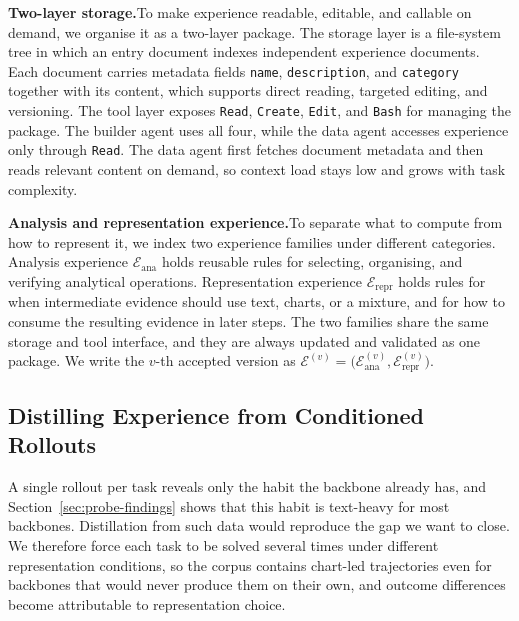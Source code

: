 \documentclass{article}
\newcommand{\stitle}[1]{\noindent\textbf{#1}}
\begin{document}
\stitle{Two-layer storage.}\quad To make experience readable, editable, and callable on demand, we organise it as a two-layer package. The storage layer is a file-system tree in which an entry document indexes independent experience documents. Each document carries metadata fields \texttt{name}, \texttt{description}, and \texttt{category} together with its content, which supports direct reading, targeted editing, and versioning. The tool layer exposes \texttt{Read}, \texttt{Create}, \texttt{Edit}, and \texttt{Bash} for managing the package. The builder agent uses all four, while the data agent accesses experience only through \texttt{Read}. The data agent first fetches document metadata and then reads relevant content on demand, so context load stays low and grows with task complexity.

\stitle{Analysis and representation experience.}\quad To separate what to compute from how to represent it, we index two experience families under different categories. Analysis experience $\mathcal{E}_{\mathrm{ana}}$ holds reusable rules for selecting, organising, and verifying analytical operations. Representation experience $\mathcal{E}_{\mathrm{repr}}$ holds rules for when intermediate evidence should use text, charts, or a mixture, and for how to consume the resulting evidence in later steps. The two families share the same storage and tool interface, and they are always updated and validated as one package. We write the $v$-th accepted version as $\mathcal{E}^{(v)}=\bigl(\mathcal{E}_{\mathrm{ana}}^{(v)},\mathcal{E}_{\mathrm{repr}}^{(v)}\bigr)$.

\subsection{Distilling Experience from Conditioned Rollouts}
\label{sec:experience-distillation}

\noindent A single rollout per task reveals only the habit the backbone already has, and Section~\ref{sec:probe-findings} shows that this habit is text-heavy for most backbones. Distillation from such data would reproduce the gap we want to close. We therefore force each task to be solved several times under different representation conditions, so the corpus contains chart-led trajectories even for backbones that would never produce them on their own, and outcome differences become attributable to representation choice.
\end{document}
